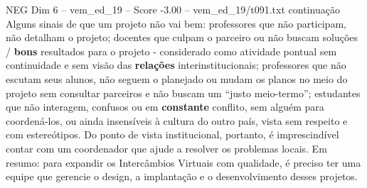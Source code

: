 \begin{textsample}{NEG Dim 6 – vem\_ed\_19 – Score -3.00 – vem\_ed\_19/t091.txt}  \label{ex:f6_neg_047}
continuação Alguns sinais de que um projeto não vai bem: professores que não participam, não detalham o projeto; docentes que culpam o parceiro ou não buscam soluções / \textbf{bons} resultados para o projeto - considerado como atividade pontual sem continuidade e sem visão das \textbf{relações} interinstitucionais; professores que não escutam seus alunos, não seguem o planejado ou mudam os planos no meio do projeto sem consultar parceiros e não buscam um “justo meio-termo”; estudantes que não interagem, confusos ou em \textbf{constante} conflito, sem alguém para coordená-los, ou ainda insensíveis à cultura do outro país, vista sem respeito e com estereótipos.
Do ponto de vista institucional, portanto, é imprescindível contar com um coordenador que ajude a resolver os problemas locais.
Em resumo: para expandir os Intercâmbios Virtuais com qualidade, é preciso ter uma equipe que gerencie o design, a implantação e o desenvolvimento desses projetos.

\end{textsample}
